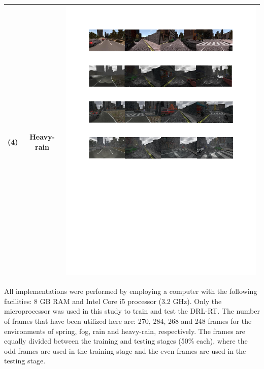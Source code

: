 \documentclass{svproc}
\begin{document}
\begin{table}[!t]
\begin{tabular}{|C{1.5cm}|c|C{8.5cm}|}
			(4)	& Heavy- rain & \begin{minipage}{.9\textwidth}\includegraphics[scale=.5,trim=2cm 12.5cm 2cm 14.3cm,clip]{examples.pdf}\end{minipage} \\ \hline
		\end{tabular}
	\end{table}
	All implementations were performed by employing a computer with the following facilities: 8 GB RAM and Intel Core i5 processor (3.2 GHz). Only the microprocessor was used in this study to train and test the DRL-RT. The number of frames that have been utilized here are: 270, 284, 268 and 248 frames for the environments of spring, fog, rain and heavy-rain, respectively. The frames are equally divided between the training and testing stages (50\% each), where the odd frames are used in the training stage and the even frames are used in the testing stage.
\end{document}
